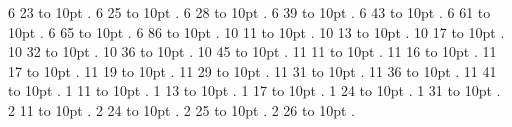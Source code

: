 6 23 \leaders\hbox to 10pt {\hss.\hss}  \hfill {}
\smallskip
{} 6 25 \leaders\hbox to 10pt {\hss.\hss}  \hfill {}
\smallskip
{} 6 28 \leaders\hbox to 10pt {\hss.\hss}  \hfill {}
\smallskip
{} 6 39 \leaders\hbox to 10pt {\hss.\hss}  \hfill {}
\smallskip
{} 6 43 \leaders\hbox to 10pt {\hss.\hss}  \hfill {}
\smallskip
{} 6 61 \leaders\hbox to 10pt {\hss.\hss}  \hfill {}
\smallskip
{} 6 65 \leaders\hbox to 10pt {\hss.\hss}  \hfill {}
\smallskip
{} 6 86 \leaders\hbox to 10pt {\hss.\hss}  \hfill {}
\smallskip
{} 10 11 \leaders\hbox to 10pt {\hss.\hss}  \hfill {}
\smallskip
{} 10 13 \leaders\hbox to 10pt {\hss.\hss}  \hfill {}
\smallskip
{} 10 17 \leaders\hbox to 10pt {\hss.\hss}  \hfill {}
\smallskip
{} 10 32 \leaders\hbox to 10pt {\hss.\hss}  \hfill {}
\smallskip
{} 10 36 \leaders\hbox to 10pt {\hss.\hss}  \hfill {}
\smallskip
{} 10 45 \leaders\hbox to 10pt {\hss.\hss}  \hfill {}
\smallskip
{} 11 11 \leaders\hbox to 10pt {\hss.\hss}  \hfill {}
\smallskip
{} 11 16 \leaders\hbox to 10pt {\hss.\hss}  \hfill {}
\smallskip
{} 11 17 \leaders\hbox to 10pt {\hss.\hss}  \hfill {}
\smallskip
{} 11 19 \leaders\hbox to 10pt {\hss.\hss}  \hfill {}
\smallskip
{} 11 29 \leaders\hbox to 10pt {\hss.\hss}  \hfill {}
\smallskip
{} 11 31 \leaders\hbox to 10pt {\hss.\hss}  \hfill {}
\smallskip
{} 11 36 \leaders\hbox to 10pt {\hss.\hss}  \hfill {}
\smallskip
{} 11 41 \leaders\hbox to 10pt {\hss.\hss}  \hfill {}
\smallskip
{} 1 11 \leaders\hbox to 10pt {\hss.\hss}  \hfill {}
\smallskip
{} 1 13 \leaders\hbox to 10pt {\hss.\hss}  \hfill {}
\smallskip
{} 1 17 \leaders\hbox to 10pt {\hss.\hss}  \hfill {}
\smallskip
{} 1 24 \leaders\hbox to 10pt {\hss.\hss}  \hfill {}
\smallskip
{} 1 31 \leaders\hbox to 10pt {\hss.\hss}  \hfill {}
\smallskip
{} 2 11 \leaders\hbox to 10pt {\hss.\hss}  \hfill {}
\smallskip
{} 2 24 \leaders\hbox to 10pt {\hss.\hss}  \hfill {}
\smallskip
{} 2 25 \leaders\hbox to 10pt {\hss.\hss}  \hfill {}
\smallskip
{} 2 26 \leaders\hbox to 10pt {\hss.\hss}  \hfill {}
